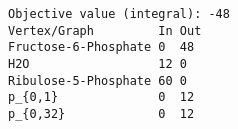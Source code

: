 \begin{verbatim}
Objective value (integral): -48
Vertex/Graph         In Out 
Fructose-6-Phosphate 0  48  
H2O                  12 0   
Ribulose-5-Phosphate 60 0   
p_{0,1}              0  12  
p_{0,32}             0  12  
\end{verbatim}
